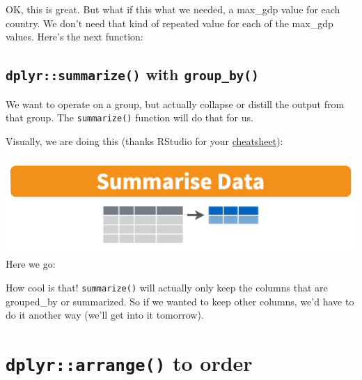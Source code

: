 \documentclass[]{book}
\newenvironment{Shaded}{\begin{snugshade}}{\end{snugshade}}
\newcommand{\KeywordTok}[1]{\textcolor[rgb]{0.13,0.29,0.53}{\textbf{{#1}}}}
\newcommand{\DataTypeTok}[1]{\textcolor[rgb]{0.13,0.29,0.53}{{#1}}}
\newcommand{\StringTok}[1]{\textcolor[rgb]{0.31,0.60,0.02}{{#1}}}
\newcommand{\NormalTok}[1]{{#1}}
\theoremstyle{definition}
\theoremstyle{definition}
\theoremstyle{definition}
\theoremstyle{remark}
\begin{document}
OK, this is great. But what if this what we needed, a max\_gdp value for
each country. We don't need that kind of repeated value for each of the
max\_gdp values. Here's the next function:

\subsection{\texorpdfstring{\texttt{dplyr::summarize()} with
\texttt{group\_by()}}{dplyr::summarize() with group\_by()}}\label{dplyrsummarize-with-group_by}

We want to operate on a group, but actually collapse or distill the
output from that group. The \texttt{summarize()} function will do that
for us.

Visually, we are doing this (thanks RStudio for your
\href{http://www.rstudio.com/wp-content/uploads/2015/02/data-wrangling-cheatsheet.pdf}{cheatsheet}):

\includegraphics{img/rstudio-cheatsheet-summarise.png} Here we go:

\begin{Shaded}
\end{Shaded}

How cool is that! \texttt{summarize()} will actually only keep the
columns that are grouped\_by or summarized. So if we wanted to keep
other columns, we'd have to do it another way (we'll get into it
tomorrow).

\section{\texorpdfstring{\texttt{dplyr::arrange()} to
order}{dplyr::arrange() to order}}\label{dplyrarrange-to-order}
\end{document}
